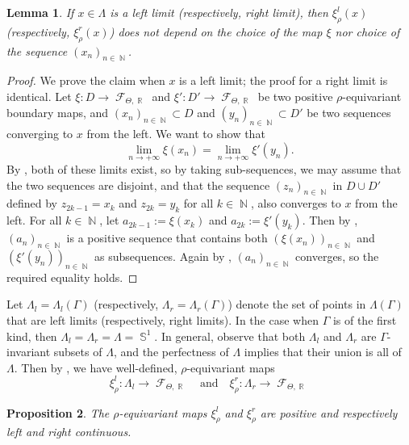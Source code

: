 \documentclass{amsart}
\theoremstyle{plain}
\newtheorem{proposition}{Proposition}[section]
\newtheorem{lemma}[proposition]{Lemma}
\theoremstyle{definition}
\DeclareMathOperator{\Fc}{\mathcal{F}}
\DeclareMathOperator{\Nb}{{\mathbb{N}}}
\DeclareMathOperator{\Rb}{{\mathbb{R}}}
\DeclareMathOperator{\Sb}{\mathbb{S}}
\newcommand{\1}{\mathbf{1}}
\begin{document}
\begin{lemma}\label{lemma: left and right limit independent of the choice of limit map}
If $x\in\Lambda$ is a left limit (respectively, right limit), then  $\xi_\rho^l(x)$ (respectively, $\xi_\rho^r(x)$) does not depend on the choice of the map $\xi$ nor choice of the sequence $(x_n)_{n\in \Nb}$. 
\end{lemma}
\begin{proof}
We prove the claim when $x$ is a left limit; the proof for a right limit is identical. Let $\xi \colon D \to \Fc_{\Theta,\Rb}$ and $\xi'\colon D' \to \Fc_{\Theta, \Rb}$ be two positive $\rho$-equivariant boundary maps, and $(x_n)_{n\in \Nb} \subset D$ and $(y_n)_{n\in \Nb}\subset {D'}$ be two sequences converging to $x$ from the left. We want to show that
\[\lim_{n\to+\infty}\xi(x_n)=\lim_{n\to+\infty}\xi'(y_n).\]
By , both of these limits exist, so by taking sub-sequences, we may assume that the two sequences are disjoint, and that the sequence $(z_n)_{n\in\Nb}$ in $D\cup D'$ defined by $z_{2k-1}=x_k$ and $z_{2k}=y_k$ for all $k\in\Nb$, also converges to $x$ from the left. For all $k\in\Nb$, let $a_{2k-1}:=\xi(x_k)$ and $a_{2k}:=\xi'(y_k)$. Then by , $(a_n)_{n\in\Nb}$ is a positive sequence that contains both $(\xi(x_n))_{n\in\Nb}$ and $(\xi'(y_n))_{n\in\Nb}$ as subsequences. Again by , $(a_n)_{n\in\Nb}$ converges, so the required equality holds.
\end{proof}

Let $\Lambda_l=\Lambda_l(\Gamma)$ (respectively, $\Lambda_r=\Lambda_r(\Gamma)$) denote the set of points in $\Lambda(\Gamma)$ that are left limits (respectively, right limits). In the case when $\Gamma$ is of the first kind, then $\Lambda_l=\Lambda_r=\Lambda=\Sb^1$. In general, observe that both $\Lambda_l$ and $\Lambda_r$ are $\Gamma$-invariant subsets of $\Lambda$, and the perfectness of $\Lambda$ implies that their union is all of $\Lambda$. Then by , we have well-defined, $\rho$-equivariant maps
\[\xi_\rho^l:\Lambda_l\to\Fc_{\Theta,\Rb}\quad\text{and}\quad\xi_\rho^r:\Lambda_r\to\Fc_{\Theta,\Rb}\]

\begin{proposition} \label{prop: the maps are left and right continuous}
    The $\rho$-equivariant maps $\xi_\rho^l$ and $\xi_\rho^r$ are positive and respectively left and right continuous.
\end{proposition}
\end{document}
